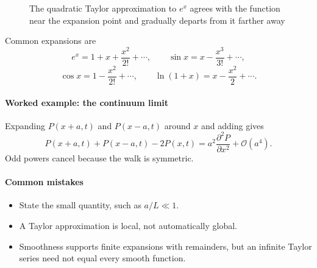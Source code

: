 \begin{figure}[ht]
    \centering
    \caption{The quadratic Taylor approximation to $e^x$ agrees with the function near the expansion point and gradually departs from it farther away}
    \label{fig:taylor-approximation}
\end{figure}

Common expansions are
\[
    e^x=1+x+\frac{x^2}{2!}+\cdots, \qquad \sin x=x-\frac{x^3}{3!}+\cdots,
\]
\[
    \cos x=1-\frac{x^2}{2!}+\cdots, \qquad \ln(1+x)=x-\frac{x^2}{2}+\cdots.
\]

\paragraph{Worked example: the continuum limit}
Expanding $P(x+a,t)$ and $P(x-a,t)$ around $x$ and adding gives
\[
    P(x+a,t)+P(x-a,t)-2P(x,t)=a^2\frac{\partial^2P}{\partial x^2}+\mathcal{O}(a^4).
\]
Odd powers cancel because the walk is symmetric.

\paragraph{Common mistakes}
\begin{itemize}
    \item State the small quantity, such as $a/L\ll1$.
    \item A Taylor approximation is local, not automatically global.
    \item Smoothness supports finite expansions with remainders, but an infinite Taylor series need not equal every smooth function.
\end{itemize}


